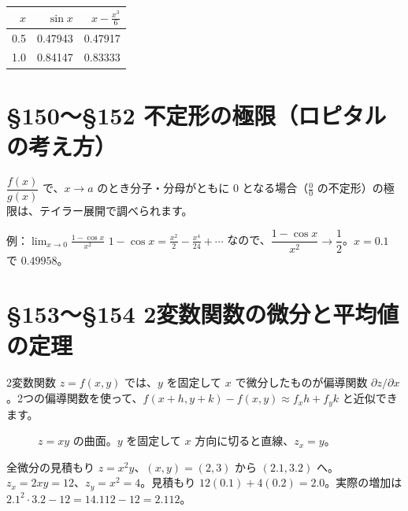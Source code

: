 \documentclass[a4paper,11pt,openany]{ltjsbook}
\begin{document}
\begin{center}
\begin{tabular}{rrr}
\toprule
$x$ & $\sin x$ & $x-\frac{x^3}{6}$\\
\midrule
0.5 & 0.47943 & 0.47917\\
1.0 & 0.84147 & 0.83333\\
\bottomrule
\end{tabular}
\end{center}

\section{§150〜§152 不定形の極限（ロピタルの考え方）}

$\dfrac{f(x)}{g(x)}$ で、$x\to a$ のとき分子・分母がともに $0$ となる場合（$\frac00$ の不定形）の極限は、テイラー展開で調べられます。

\begin{examplebox}{例：$\displaystyle\lim_{x\to0}\frac{1-\cos x}{x^2}$}
$1-\cos x=\frac{x^2}{2}-\frac{x^4}{24}+\cdots$ なので、$\dfrac{1-\cos x}{x^2}\to\dfrac12$。$x=0.1$ で $0.49958$。
\end{examplebox}

\section{§153〜§154 2変数関数の微分と平均値の定理}

2変数関数 $z=f(x,y)$ では、$y$ を固定して $x$ で微分したものが偏導関数 $\partial z/\partial x$。2つの偏導関数を使って、$f(x+h,y+k)-f(x,y)\approx f_xh+f_yk$ と近似できます。

\begin{figure}[htbp]
\centering
{}
\caption{$z=xy$ の曲面。$y$ を固定して $x$ 方向に切ると直線、$z_x=y$。}
\end{figure}

\begin{examplebox}{全微分の見積もり}
$z=x^2y$、$(x,y)=(2,3)$ から $(2.1,3.2)$ へ。$z_x=2xy=12$、$z_y=x^2=4$。見積もり $12(0.1)+4(0.2)=2.0$。実際の増加は $2.1^2\cdot3.2-12=14.112-12=2.112$。
\end{examplebox}
\end{document}
